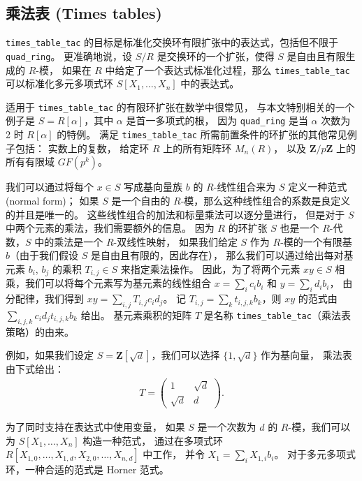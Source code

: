 \documentclass[sigplan,10pt,nonacm,
screen]{acmart} \settopmatter{printfolios=true,printccs=false,printacmref=false}
\newcommand{\ZZ}{\mathbf{Z}}
\begin{document}
\subsection{乘法表 (Times tables)}

\lstinline{times_table_tac} 的目标是标准化交换环有限扩张中的表达式，包括但不限于 \lstinline{quad_ring}。
更准确地说，设 $S/R$ 是交换环的一个扩张，使得 $S$ 是自由且有限生成的 $R$-模，
如果在 $R$ 中给定了一个表达式标准化过程，那么 \lstinline{times_table_tac} 可以标准化多元多项式环 $S[X_1, \dots, X_n]$ 中的表达式。

适用于 \lstinline{times_table_tac} 的有限环扩张在数学中很常见，
与本文特别相关的一个例子是 $S = R[\alpha]$，其中 $\alpha$ 是首一多项式的根，
因为 \lstinline{quad_ring} 是当 $\alpha$ 次数为 2 时 $R[\alpha]$ 的特例。
满足 \lstinline{times_table_tac} 所需前置条件的环扩张的其他常见例子包括：
实数上的复数，
给定环 $R$ 上的所有矩阵环 $M_{n}(R)$，
以及 $\ZZ/p\ZZ$ 上的所有有限域 $GF(p^k)$。

我们可以通过将每个 $x \in S$ 写成基向量族 $b$ 的 $R$-线性组合来为 $S$ 定义一种范式 (normal form)；
如果 $S$ 是一个自由的 $R$-模，那么这种线性组合的系数是良定义的并且是唯一的。
这些线性组合的加法和标量乘法可以逐分量进行，
但是对于 $S$ 中两个元素的乘法，我们需要额外的信息。
因为 $R$ 的环扩张 $S$ 也是一个 $R$-代数，$S$ 中的乘法是一个 $R$-双线性映射，
如果我们给定 $S$ 作为 $R$-模的一个有限基 $b$（由于我们假设 $S$ 是自由且有限的，因此存在），
那么我们可以通过给出每对基元素 $b_i$, $b_j$ 的乘积 $T_{i, j} \in S$ 来指定乘法操作。
因此，为了将两个元素 $x y \in S$ 相乘，我们可以将每个元素写为基元素的线性组合 $x = \sum_i c_i b_i$ 和 $y = \sum_i d_i b_i$，
由分配律，我们得到 $xy = \sum_{i, j} T_{i, j} c_i d_j$。
记 $T_{i, j} = \sum_k t_{i, j, k} b_k$，则 $xy$ 的范式由 $\sum_{i, j, k} c_i d_j t_{i, j, k} b_k$ 给出。
基元素乘积的矩阵 $T$ 是名称 \lstinline{times_table_tac}（乘法表策略）的由来。

例如，如果我们设定 $S = \ZZ[\sqrt d]$，我们可以选择 $\{1, \sqrt d\}$ 作为基向量，
乘法表由下式给出：
\begin{align*}
	T = \begin{pmatrix}
		1 & \sqrt d \\
		\sqrt d & d
	\end{pmatrix}.
\end{align*}

为了同时支持在表达式中使用变量，
如果 $S$ 是一个次数为 $d$ 的 $R$-模，我们可以为 $S[X_1, \dots, X_n]$ 构造一种范式，
通过在多项式环 $R[X_{1, 0}, \dots, X_{1, d}, X_{2, 0}, \dots, X_{n, d}]$ 中工作，
并令 $X_1 = \sum_i X_{1, i} b_i$。
对于多元多项式环，一种合适的范式是 Horner 范式。
\end{document}
